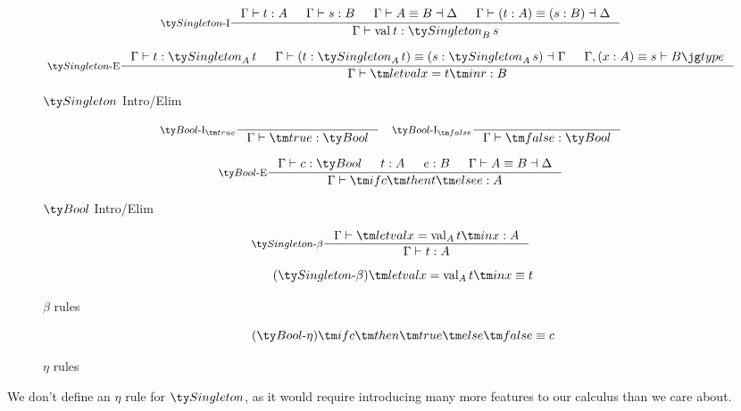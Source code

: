 \begin{figure*}[h]
  \[
  \inference[\Intro{$\Singleton$}]
            { \Gamma \vdash t : A
            & \Gamma \vdash s : B
            & \Gamma \vdash A \equiv B \dashv \Delta
            & \Gamma \vdash (t : A) \equiv (s : B) \dashv \Delta
            }
            {\Gamma \vdash \val[][t] : \Singleton[B][s]}
  \]

  \[
  \inference[\Elim{$\Singleton$}]
            {\Gamma \vdash t : \Singleton[A][t]
            & \Gamma \vdash (t : \Singleton[A][t]) \equiv (s : \Singleton[A][s]) \dashv \Gamma
            & \Gamma, (x : A) \equiv s \vdash \type B}
            {\Gamma \vdash \letval x t r : B}
  \]

  \caption*{$\Singleton$ Intro/Elim}
  \label{fig:dt-singletons-singleton-intro-elim}
\end{figure*}

\begin{figure*}[h]
  \[
  \inference[\Intro{$\Bool$}$_{\true}$]{}
            {\Gamma \vdash \true : \Bool}
  \quad
  \inference[\Intro{$\Bool$}$_{\false}$]{}
            {\Gamma \vdash \false : \Bool}
  \]

  \[
  \inference[\Elim{$\Bool$}]
            {\Gamma \vdash c : \Bool
            & t : A
            & e : B
            & \Gamma \vdash A \equiv B \dashv \Delta
            }
            {\Gamma \vdash \ite c t e : A}
  \]

  \caption*{$\Bool$ Intro/Elim}
  \label{fig:dt-singletons-bool-intro-elim}
\end{figure*}



\begin{figure*}[h]
  \[
  \inference[$\Singleton$-$\beta$]
            { \Gamma \vdash \letval x {\val[A][t]} x : A
            }
            {\Gamma \vdash t : A}
  \]

  \begin{equation}
    \tag{$\Singleton$-$\beta$}
    \letval x {\val[A][t]} x \equiv t
  \end{equation}

  \caption*{$\beta$ rules}
  \label{fig:dt-singletons-beta}
\end{figure*}


\begin{figure*}[h]
  \begin{equation}
    \tag{$\Bool$-$\eta$}
    \ite c \true \false \equiv c
  \end{equation}

  \caption*{$\eta$ rules}
  \label{fig:dt-singletons-eta}
\end{figure*}

We don't define an $\eta$ rule for $\Singleton$, as it would require introducing many more features to our calculus than we care about.
